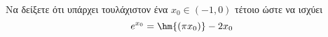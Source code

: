 Να δείξετε ότι υπάρχει τουλάχιστον ένα $ x_0\in(-1,0) $ τέτοιο ώστε να ισχύει
\[ e^{x_0}=\hm{(\pi x_0)}-2x_0 \]
